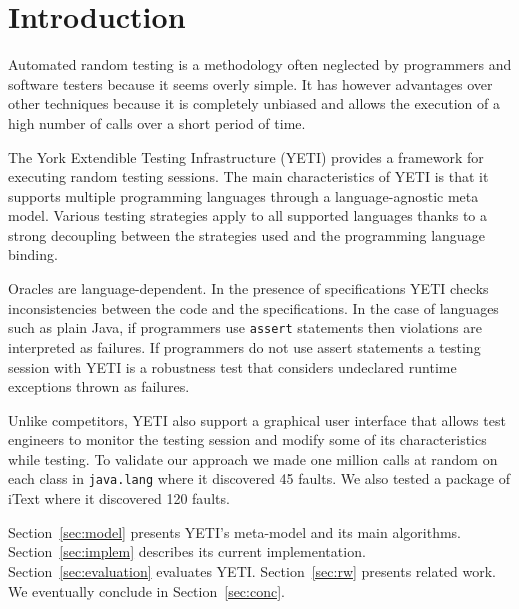 \section{Introduction}\label{sec:intro}

Automated random testing is a methodology often neglected by 
programmers and software testers because it seems overly
simple. It has however advantages over other techniques because 
it is completely unbiased and allows the execution of a high number 
of calls over a short period of time.


The York Extendible Testing Infrastructure (YETI) provides a framework 
for executing random testing sessions. The main characteristics of 
YETI is that it supports multiple programming languages through a 
language-agnostic meta model. Various testing strategies apply
to all supported languages thanks to a strong decoupling between the 
strategies used and the programming language binding. 

Oracles are language-dependent. In the presence of specifications YETI checks 
inconsistencies between the code and the specifications. In the case of 
languages such as plain Java, if programmers use \texttt{assert} statements 
then violations are interpreted as failures. If programmers do not use assert 
statements a testing session with YETI is a robustness test that
considers undeclared runtime exceptions thrown as failures.

Unlike competitors, YETI also support a graphical user interface that 
allows test engineers to monitor the testing session and modify some 
of its characteristics while testing. To validate our approach we made 
one million calls at random on each class in \texttt{java.lang} where 
it discovered 45 faults. We also tested a package of iText where it 
discovered 120 faults. 


Section~\ref{sec:model} presents YETI's meta-model and its main algorithms.
Section~\ref{sec:implem} describes its current implementation.
Section~\ref{sec:evaluation} evaluates YETI.
Section~\ref{sec:rw} presents related work.
We eventually conclude in Section~\ref{sec:conc}.